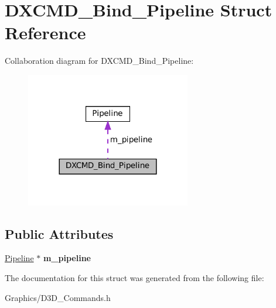 \hypertarget{structDXCMD__Bind__Pipeline}{}\section{D\+X\+C\+M\+D\+\_\+\+Bind\+\_\+\+Pipeline Struct Reference}
\label{structDXCMD__Bind__Pipeline}


Collaboration diagram for D\+X\+C\+M\+D\+\_\+\+Bind\+\_\+\+Pipeline\+:\nopagebreak
\begin{figure}[H]
\begin{center}
\leavevmode
\includegraphics[width=204pt]{structDXCMD__Bind__Pipeline__coll__graph}
\end{center}
\end{figure}
\subsection*{Public Attributes}
\begin{DoxyCompactItemize}
\item 
\mbox{\label{structDXCMD__Bind__Pipeline_a314c679c8e740a7bd19410a4db960efa}} 
\hyperlink{classPipeline}{Pipeline} $\ast$ {\bfseries m\+\_\+pipeline}
\end{DoxyCompactItemize}


The documentation for this struct was generated from the following file\+:\begin{DoxyCompactItemize}
\item 
Graphics/D3\+D\+\_\+\+Commands.\+h\end{DoxyCompactItemize}
